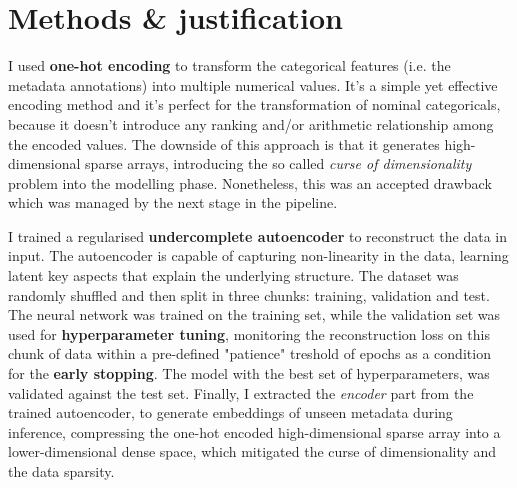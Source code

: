 
\section{Methods \& justification}

I used \textbf{one-hot encoding} to transform the categorical features (i.e. the metadata annotations) into multiple numerical values.
It's a simple yet effective encoding method and it's perfect for the transformation of nominal categoricals,
because it doesn't introduce any ranking and/or arithmetic relationship among the
encoded values. The downside of this approach is that it generates high-dimensional sparse arrays, introducing the
so called \textit{curse of dimensionality} problem into the modelling phase. Nonetheless, this was an accepted drawback which was
managed by the next stage in the pipeline.

I trained a regularised \textbf{undercomplete autoencoder} to reconstruct the data in input.
The autoencoder is capable of capturing non-linearity in the data, learning latent key aspects that explain the underlying structure.
The dataset was randomly shuffled and then split in three chunks: training, validation and test.
The neural network was trained on the training set,
while the validation set was used for \textbf{hyperparameter tuning}, monitoring the reconstruction loss on this chunk of data
within a pre-defined "patience" treshold of epochs as a condition for the \textbf{early stopping}.
The model with the best set of hyperparameters, was validated against
the test set. Finally, I extracted the \textit{encoder} part from the trained autoencoder, to generate embeddings of unseen metadata
during inference, compressing the one-hot encoded high-dimensional sparse array into a lower-dimensional dense space,
which mitigated the curse of dimensionality and the data sparsity.

